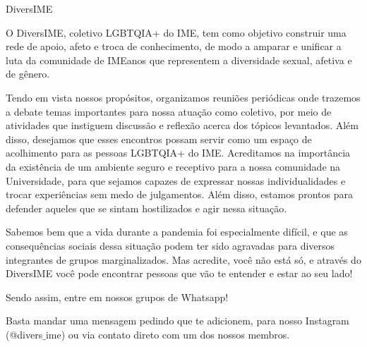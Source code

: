 \begin{subsecao}{DiversIME}

O DiversIME, coletivo LGBTQIA+ do IME, tem como objetivo construir uma rede de
apoio, afeto e troca de conhecimento, de modo a amparar e unificar a luta da
comunidade de IMEanos que representem a diversidade sexual, afetiva e de gênero. 

Tendo em vista nossos propósitos, organizamos reuniões periódicas onde trazemos
a debate temas importantes para nossa atuação como coletivo, por meio de
atividades que instiguem discussão e reflexão acerca dos tópicos levantados.
Além disso, desejamos que esses encontros possam servir como um espaço de
acolhimento para as pessoas LGBTQIA+ do IME. Acreditamos na importância da
existência de um ambiente seguro e receptivo para a nossa comunidade na
Universidade, para que sejamos capazes de expressar nossas individualidades
e trocar experiências sem medo de julgamentos. Além disso, estamos prontos
para defender aqueles que se sintam hostilizados e agir nessa situação. 

Sabemos bem que a vida durante a pandemia foi especialmente difícil, e que as 
consequências sociais dessa situação podem ter sido agravadas para diversos integrantes
de grupos marginalizados. Mas acredite, você não está só, e através do DiversIME
você pode encontrar pessoas que vão te entender e estar ao seu lado!

Sendo assim, entre em nossos grupos de Whatsapp!

Basta mandar uma mensagem pedindo que te adicionem, para nosso Instagram
(@divers$\_$ime) ou via contato direto com um dos nossos membros.

\end{subsecao}
